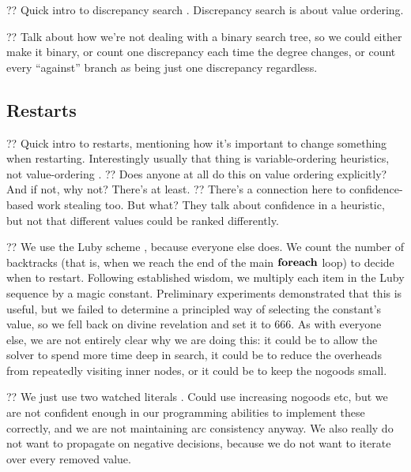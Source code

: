 \documentclass{article}
\newcommand{\citet}[1]{\citeauthor{#1} \shortcite{#1}}
\newcommand{\citep}[1]{\cite{#1}}
\begin{document}
?? Quick intro to discrepancy search
\citep{DBLP:conf/ijcai/HarveyG95,DBLP:conf/aaai/Korf96,DBLP:conf/ijcai/Walsh97,DBLP:conf/cpaior/KarouiHLN07,DBLP:journals/jea/ProsserU11}.
Discrepancy search is about value ordering.

?? Talk about how we're not dealing with a binary search tree, so we could either make it binary, or
count one discrepancy each time the degree changes, or count every ``against'' branch as being just
one discrepancy regardless.

\subsection{Restarts}

?? Quick intro to restarts, mentioning how it's important to change something when restarting.
Interestingly usually that thing is variable-ordering heuristics, not value-ordering
\citep{DBLP:conf/ijcai/LecoutreSTV07,DBLP:journals/jsat/LecoutreSTV07,DBLP:conf/cp/GayHLS15,DBLP:conf/aaai/LeeSZ16,DBLP:conf/cp/GlorianBLLM17}.
?? Does anyone at all do this on value ordering explicitly? And if not, why not? There's
\citet{DBLP:conf/flairs/RazgonOP07} at least. ?? There's a connection here to confidence-based work
stealing \citep{DBLP:conf/cp/ChuSS09} too. But what? They talk about confidence in a heuristic, but
not that different values could be ranked differently.

?? We use the Luby scheme \citep{DBLP:journals/ipl/LubySZ93}, because everyone else does. We count
the number of backtracks (that is, when we reach the end of the main $\KwSty{foreach}$ loop) to
decide when to restart. Following established wisdom, we multiply each item in the Luby sequence by
a magic constant. Preliminary experiments demonstrated that this is useful, but we failed to
determine a principled way of selecting the constant's value, so we fell back on divine revelation
and set it to 666. As with everyone else, we are not entirely clear why we are doing this: it could
be to allow the solver to spend more time deep in search, it could be to reduce the overheads from
repeatedly visiting inner nodes, or it could be to keep the nogoods small.

?? We just use two watched literals \citep{DBLP:conf/dac/MoskewiczMZZM01}. Could use increasing
nogoods \citep{DBLP:conf/aaai/LeeSZ16,DBLP:conf/cp/GlorianBLLM17} etc, but we are not confident enough
in our programming abilities to implement these correctly, and we are not maintaining arc
consistency anyway. We also really do not want to propagate on negative decisions, because we do not
want to iterate over every removed value.
\end{document}
